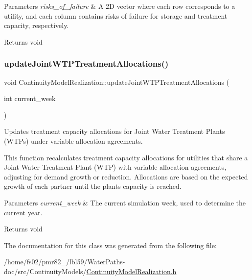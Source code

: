 \begin{DoxyParams}{Parameters}
{\em risks\+\_\+of\+\_\+failure} & A 2D vector where each row corresponds to a utility, and each column contains risks of failure for storage and treatment capacity, respectively.\\
\hline
\end{DoxyParams}
\begin{DoxyReturn}{Returns}
void 
\end{DoxyReturn}
\mbox{\label{classContinuityModelRealization_ab87c140eaf87266ca81636059e948bb7}} 
\subsubsection{\texorpdfstring{update\+Joint\+W\+T\+P\+Treatment\+Allocations()}{updateJointWTPTreatmentAllocations()}}
{\footnotesize\ttfamily void Continuity\+Model\+Realization\+::update\+Joint\+W\+T\+P\+Treatment\+Allocations (\begin{DoxyParamCaption}\item[{int}]{current\+\_\+week }\end{DoxyParamCaption})}



Updates treatment capacity allocations for Joint Water Treatment Plants (W\+T\+Ps) under variable allocation agreements. 

This function recalculates treatment capacity allocations for utilities that share a Joint Water Treatment Plant (W\+TP) with variable allocation agreements, adjusting for demand growth or reduction. Allocations are based on the expected growth of each partner until the plant\textquotesingle{}s capacity is reached.


\begin{DoxyParams}{Parameters}
{\em current\+\_\+week} & The current simulation week, used to determine the current year.\\
\hline
\end{DoxyParams}
\begin{DoxyReturn}{Returns}
void 
\end{DoxyReturn}


The documentation for this class was generated from the following file\+:\begin{DoxyCompactItemize}
\item 
/home/fs02/pmr82\+\_/lbl59/\+Water\+Paths-\/doc/src/\+Continuity\+Models/\mbox{\hyperlink{ContinuityModelRealization_8h}{Continuity\+Model\+Realization.\+h}}\end{DoxyCompactItemize}
